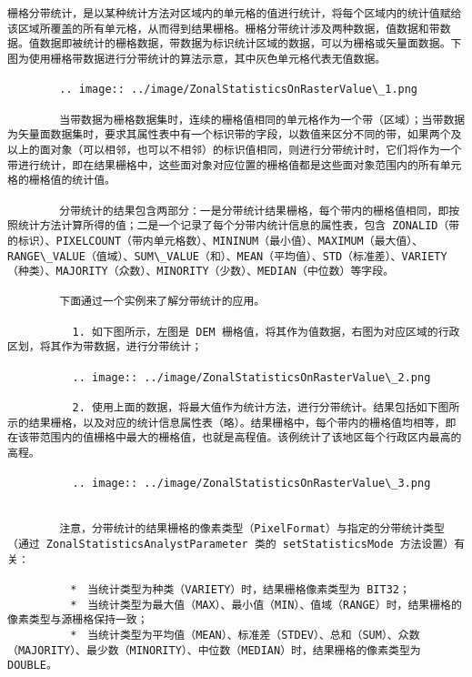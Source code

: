 \documentclass[11pt]{article}
\begin{document}
\begin{Verbatim}[commandchars=\\\{\}]
        栅格分带统计，是以某种统计方法对区域内的单元格的值进行统计，将每个区域内的统计值赋给该区域所覆盖的所有单元格，从而得到结果栅格。栅格分带统计涉及两种数据，值数据和带数据。值数据即被统计的栅格数据，带数据为标识统计区域的数据，可以为栅格或矢量面数据。下图为使用栅格带数据进行分带统计的算法示意，其中灰色单元格代表无值数据。
        
        .. image:: ../image/ZonalStatisticsOnRasterValue\_1.png
        
        当带数据为栅格数据集时，连续的栅格值相同的单元格作为一个带（区域）；当带数据为矢量面数据集时，要求其属性表中有一个标识带的字段，以数值来区分不同的带，如果两个及以上的面对象（可以相邻，也可以不相邻）的标识值相同，则进行分带统计时，它们将作为一个带进行统计，即在结果栅格中，这些面对象对应位置的栅格值都是这些面对象范围内的所有单元格的栅格值的统计值。
        
        分带统计的结果包含两部分：一是分带统计结果栅格，每个带内的栅格值相同，即按照统计方法计算所得的值；二是一个记录了每个分带内统计信息的属性表，包含 ZONALID（带的标识）、PIXELCOUNT（带内单元格数）、MININUM（最小值）、MAXIMUM（最大值）、RANGE\_VALUE（值域）、SUM\_VALUE（和）、MEAN（平均值）、STD（标准差）、VARIETY（种类）、MAJORITY（众数）、MINORITY（少数）、MEDIAN（中位数）等字段。
        
        下面通过一个实例来了解分带统计的应用。
        
          1. 如下图所示，左图是 DEM 栅格值，将其作为值数据，右图为对应区域的行政区划，将其作为带数据，进行分带统计；
        
          .. image:: ../image/ZonalStatisticsOnRasterValue\_2.png
        
          2. 使用上面的数据，将最大值作为统计方法，进行分带统计。结果包括如下图所示的结果栅格，以及对应的统计信息属性表（略）。结果栅格中，每个带内的栅格值均相等，即在该带范围内的值栅格中最大的栅格值，也就是高程值。该例统计了该地区每个行政区内最高的高程。
        
          .. image:: ../image/ZonalStatisticsOnRasterValue\_3.png
        
        
        注意，分带统计的结果栅格的像素类型（PixelFormat）与指定的分带统计类型（通过 ZonalStatisticsAnalystParameter 类的 setStatisticsMode 方法设置）有关：
        
        　*　当统计类型为种类（VARIETY）时，结果栅格像素类型为 BIT32；
        　*　当统计类型为最大值（MAX）、最小值（MIN）、值域（RANGE）时，结果栅格的像素类型与源栅格保持一致；
        　*　当统计类型为平均值（MEAN）、标准差（STDEV）、总和（SUM）、众数（MAJORITY）、最少数（MINORITY）、中位数（MEDIAN）时，结果栅格的像素类型为 DOUBLE。
        

\end{Verbatim}
\end{document}
